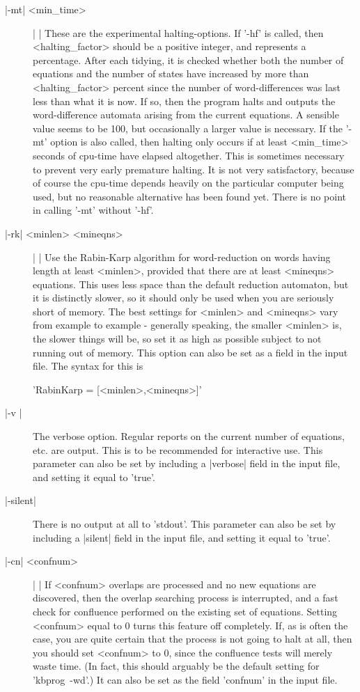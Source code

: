 \begin{description}
\item[|-mt| <min\_time>]| |\newline
These are the experimental halting-options. If '-hf' is called, then
<halting\_factor> should be a positive integer, and represents a percentage.
After each tidying, it is checked whether both the number of
equations and the number of states have increased by more than
<halting\_factor> percent since the number of word-differences was last
less than what it is now.
If so, then the program halts and outputs the
word-difference automata arising from the current equations. A sensible value
seems to be 100, but occasionally a larger value is necessary. If the
'-mt' option is also called, then halting only occurs if at least <min\_time>
seconds of cpu-time have elapsed altogether.
This is sometimes necessary to prevent very early premature halting.
It is not very satisfactory, because of course the cpu-time
depends heavily on the particular computer being used, but no reasonable
alternative has been found yet.
There is no point in calling '-mt' without '-hf'.
\item[|-rk| <minlen> <mineqns>] | |\newline
Use the Rabin-Karp algorithm for word-reduction on words having length at least
<minlen>, provided that there are at least <mineqns> equations.
This uses less space than the default reduction automaton, but it is
distinctly slower, so it should only be used when you are seriously short of
memory.
The best settings for <minlen> and <mineqns> vary from example to
example - generally speaking, the smaller <minlen> is, the slower things
will be, so set it as high as possible subject to not running out of memory.
This option can also be set as a field in the input file.
The syntax for this is

'RabinKarp \:= [<minlen>,<mineqns>]'
\item[|-v |]
The verbose option. Regular reports on the current number of equations, etc. are
output. This is to be recommended for interactive use.
This parameter can also be set by including a |verbose| field in the input
file, and setting it equal to 'true'.
\item[|-silent|]
There is no output at all to 'stdout'.
This parameter can also be set by including a |silent| field in the input
file, and setting it equal to 'true'.
\item[|-cn| <confnum>] | |\newline
If <confnum> overlaps are processed and no new equations are discovered, then
the overlap searching process is interrupted, and a fast check for
confluence performed on the existing set of equations.
Setting <confnum> equal to 0 turns this feature off completely.
If, as is often the case, you are quite certain that the process is not going
to halt at all, then you should set <confnum> to 0, since the confluence
tests will merely waste time. (In fact, this should arguably be the
default setting for 'kbprog\ -wd'.)
It can also be set as the field 'confnum' in the input file.
\end{description}

